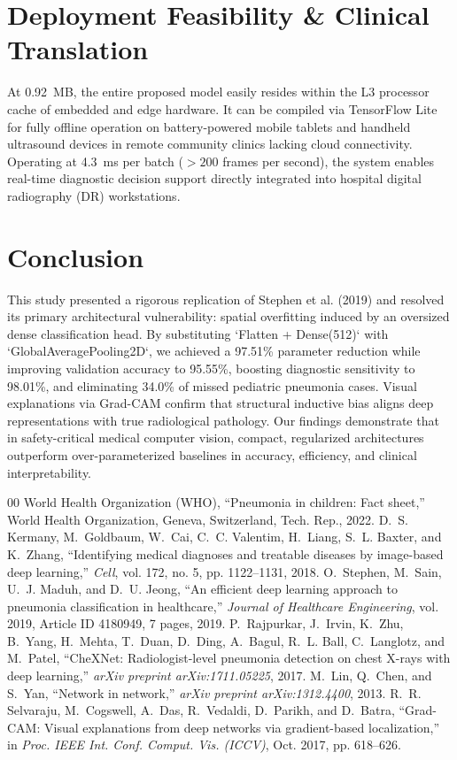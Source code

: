 \documentclass[conference]{IEEEtran}
\begin{document}
\section{Deployment Feasibility \& Clinical Translation}
At 0.92~MB, the entire proposed model easily resides within the L3 processor cache of embedded and edge hardware. It can be compiled via TensorFlow Lite for fully offline operation on battery-powered mobile tablets and handheld ultrasound devices in remote community clinics lacking cloud connectivity. Operating at 4.3~ms per batch ($>200$ frames per second), the system enables real-time diagnostic decision support directly integrated into hospital digital radiography (DR) workstations.

\section{Conclusion}
This study presented a rigorous replication of Stephen et al. (2019) and resolved its primary architectural vulnerability: spatial overfitting induced by an oversized dense classification head. By substituting `Flatten + Dense(512)` with `GlobalAveragePooling2D`, we achieved a 97.51\% parameter reduction while improving validation accuracy to 95.55\%, boosting diagnostic sensitivity to 98.01\%, and eliminating 34.0\% of missed pediatric pneumonia cases. Visual explanations via Grad-CAM confirm that structural inductive bias aligns deep representations with true radiological pathology. Our findings demonstrate that in safety-critical medical computer vision, compact, regularized architectures outperform over-parameterized baselines in accuracy, efficiency, and clinical interpretability.

\begin{thebibliography}{00}
 World Health Organization (WHO), ``Pneumonia in children: Fact sheet,'' World Health Organization, Geneva, Switzerland, Tech. Rep., 2022.
 D.~S. Kermany, M.~Goldbaum, W.~Cai, C.~C. Valentim, H.~Liang, S.~L. Baxter, and K.~Zhang, ``Identifying medical diagnoses and treatable diseases by image-based deep learning,'' \emph{Cell}, vol. 172, no. 5, pp. 1122--1131, 2018.
 O.~Stephen, M.~Sain, U.~J. Maduh, and D.~U. Jeong, ``An efficient deep learning approach to pneumonia classification in healthcare,'' \emph{Journal of Healthcare Engineering}, vol. 2019, Article ID 4180949, 7 pages, 2019.
 P.~Rajpurkar, J.~Irvin, K.~Zhu, B.~Yang, H.~Mehta, T.~Duan, D.~Ding, A.~Bagul, R.~L. Ball, C.~Langlotz, and M.~Patel, ``CheXNet: Radiologist-level pneumonia detection on chest X-rays with deep learning,'' \emph{arXiv preprint arXiv:1711.05225}, 2017.
 M.~Lin, Q.~Chen, and S.~Yan, ``Network in network,'' \emph{arXiv preprint arXiv:1312.4400}, 2013.
 R.~R. Selvaraju, M.~Cogswell, A.~Das, R.~Vedaldi, D.~Parikh, and D.~Batra, ``Grad-CAM: Visual explanations from deep networks via gradient-based localization,'' in \emph{Proc. IEEE Int. Conf. Comput. Vis. (ICCV)}, Oct. 2017, pp. 618--626.
\end{thebibliography}
\end{document}
